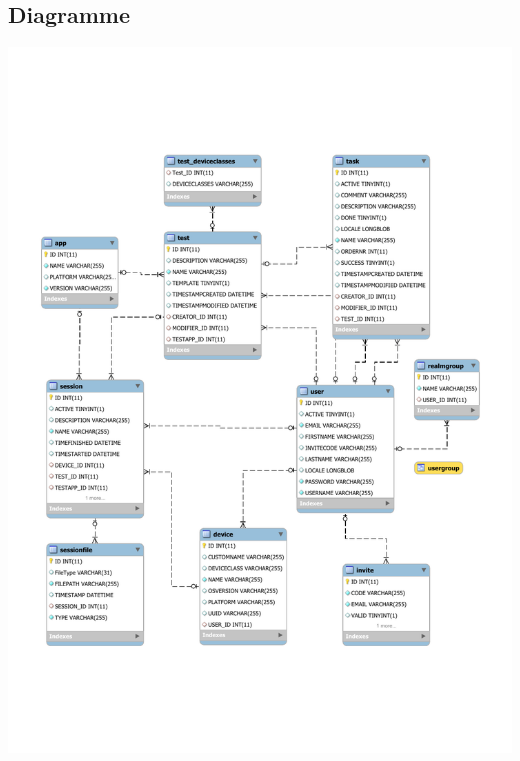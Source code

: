 \subsection{Diagramme}
\begin{minipage}[t]{\textwidth}
	\centering
	\includegraphics[width=0.95\linewidth]{img/datenbankschema}
	\label{fig:datenmankschema}
\end{minipage}